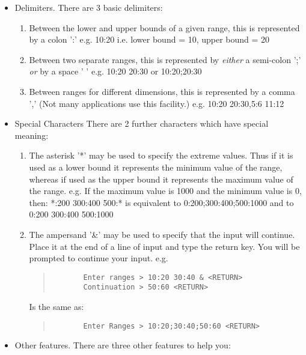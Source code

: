\documentclass{book}
\renewcommand{\_}{{\tt\char'137}}     %
\begin{document}
\begin{itemize}
\item Delimiters. There are 3 basic delimiters:
 
\begin{enumerate}
\item Between the lower and upper bounds of a given range,
this is represented by a colon ':'
e.g. 10:20
i.e. lower bound = 10, upper bound = 20
\item Between two separate ranges,
this is represented by {\em either} a semi-colon ';' {\em or} by a
space ' '
e.g. 10:20 20:30 or 10:20;20:30
\item Between ranges for different dimensions,
this is represented by a comma ','
(Not many applications use this facility.)
e.g. 10:20 20:30,5:6 11:12
\end{enumerate}
\item Special Characters
There are 2 further characters which have special meaning:
 
 
\begin{enumerate}
\item The asterisk '*' may be used to specify the extreme
values. Thus if it is used as a lower bound it represents
the minimum value of the range, whereas if used as the
upper bound it represents the maximum value of the range.
e.g. If the maximum value is 1000 and the minimum value
is 0, then:
*:200 300:400 500:*
is equivalent to
0:200;300:400;500:1000
and to
0:200 300:400 500:1000
\item The ampersand '\&' may be used to specify that the input
will continue. Place it at the end of a line of input and
type the return key. You will be prompted to continue
your input.
e.g.
\begin{quote}\begin{verbatim}
       Enter ranges > 10:20 30:40 & <RETURN>
       Continuation > 50:60 <RETURN>
       \end{verbatim}\end{quote}
Is the same as:
\begin{quote}\begin{verbatim}
       Enter Ranges > 10:20;30:40;50:60 <RETURN>
       \end{verbatim}\end{quote}
\end{enumerate}
\item Other features.
There are three other features to help you:
 

\end{itemize}
\end{document}
